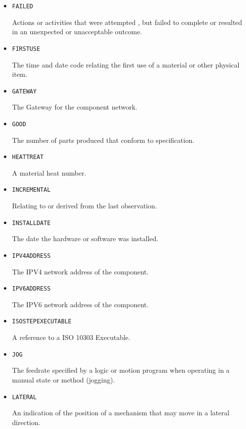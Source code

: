 \begin{itemize}
\item \texttt{FAILED}  

Actions or activities that were attempted , but failed to complete or resulted in an unexpected or unacceptable outcome.


\item \texttt{FIRST\textunderscore USE}  

The time and date code relating the first use of a material or other physical item.


\item \texttt{GATEWAY}  

The Gateway for the component network.


\item \texttt{GOOD}  

The number of parts produced that conform to specification.


\item \texttt{HEAT\textunderscore TREAT}  

A material heat number.


\item \texttt{INCREMENTAL}  

Relating to or derived from the last \gls{observation}.


\item \texttt{INSTALL\textunderscore DATE}  

The date the hardware or software was installed.


\item \texttt{IPV4\textunderscore ADDRESS}  

The IPV4 network address of the component.


\item \texttt{IPV6\textunderscore ADDRESS}  

The IPV6 network address of the component.


\item \texttt{ISO\textunderscore STEP\textunderscore EXECUTABLE}  

A reference to a ISO 10303 Executable.


\item \texttt{JOG}  

The feedrate specified by a logic or motion program when operating in a manual state or method (jogging).


\item \texttt{LATERAL}  

An indication of the position of a mechanism that may move in a lateral direction.



\end{itemize}
